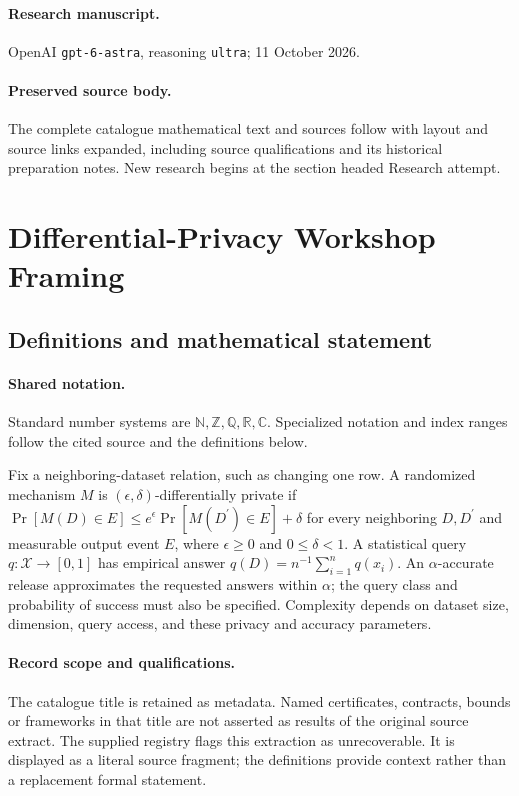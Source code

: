 \documentclass[11pt]{article}
\begin{document}
\paragraph{Research manuscript.} OpenAI \texttt{gpt-6-astra}, reasoning \texttt{ultra}; 11 October 2026.
\paragraph{Preserved source body.} The complete catalogue mathematical text and sources follow with layout and source links expanded, including source qualifications and its historical preparation notes. New research begins at the section headed Research attempt.

\section{Differential-Privacy Workshop Framing}\label{statement}

\subsection{Definitions and mathematical statement}

\paragraph{Shared notation.}Standard number systems are $\mathbb N,\mathbb Z,\mathbb Q,\mathbb R,\mathbb C$. Specialized notation and index ranges follow the cited source and the definitions below.


Fix a neighboring-dataset relation, such as changing one row. A randomized mechanism $M$ is $(\epsilon,\delta)$-differentially private if $\Pr[M(D)\in E]\le e^\epsilon\Pr[M(D^{\prime})\in E]+\delta$ for every neighboring $D,D^{\prime}$ and measurable output event $E$, where $\epsilon\ge0$ and $0\le\delta<1$. A statistical query $q:\mathcal X\to[0,1]$ has empirical answer $q(D)=n^{-1}\sum_{i=1}^n q(x_i)$. An $\alpha$-accurate release approximates the requested answers within $\alpha$; the query class and probability of success must also be specified. Complexity depends on dataset size, dimension, query access, and these privacy and accuracy parameters.
\paragraph{Record scope and qualifications.}
The catalogue title is retained as metadata. Named certificates, contracts, bounds or frameworks in that title are not asserted as results of the original source extract.
The supplied registry flags this extraction as unrecoverable. It is displayed as a literal source fragment; the definitions provide context rather than a replacement formal statement.
\end{document}
